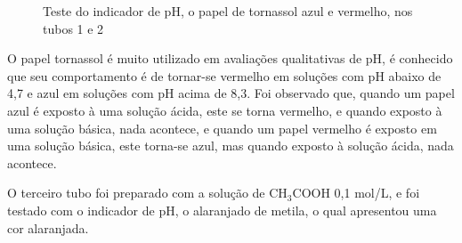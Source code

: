 \begin{figure}[h]
            \caption{Teste do indicador de pH, o papel de tornassol azul e vermelho, nos tubos 1 e 2}\label{fig:experimento11}
        \end{figure}

        \indent O papel tornassol é muito utilizado em avaliações qualitativas de pH, é conhecido que seu comportamento é de tornar-se vermelho em soluções com pH abaixo de 4,7 e azul em soluções com pH acima de 8,3. Foi observado que, quando um papel azul é exposto à uma solução ácida, este se torna vermelho, e quando exposto à uma solução básica, nada acontece, e quando um papel vermelho é exposto em uma solução básica, este torna-se azul, mas quando exposto à solução ácida, nada acontece.
        \newpage

        \indent O terceiro tubo foi preparado com a solução de CH$_3$COOH 0,1 mol/L, e foi testado com o indicador de pH, o alaranjado de metila, o qual apresentou uma cor alaranjada.

